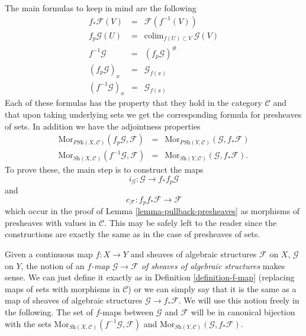 \medskip\noindent
The main formulas to keep in mind are the following
\begin{eqnarray*}
f_*\mathcal{F}(V) & = & \mathcal{F}(f^{-1}(V)) \\
f_p\mathcal{G}(U) & = & \text{colim}_{f(U) \subset V}\ \mathcal{G}(V) \\
f^{-1}\mathcal{G} & = & (f_p\mathcal{G})^\# \\
(f_p\mathcal{G})_x & = & \mathcal{G}_{f(x)} \\
(f^{-1}\mathcal{G})_x & = & \mathcal{G}_{f(x)}
\end{eqnarray*}
Each of these formulas has the property that they hold in the
category $\mathcal{C}$ and that upon taking underlying
sets we get the corresponding formula for presheaves of sets.
In addition we have the adjointness properties
\begin{eqnarray*}
\text{Mor}_{\textit{PSh}(X, \mathcal{C})}(f_p\mathcal{G}, \mathcal{F})
& = &
\text{Mor}_{\textit{PSh}(Y, \mathcal{C})}(\mathcal{G}, f_*\mathcal{F}) \\
\text{Mor}_{\textit{Sh}(X, \mathcal{C})}(f^{-1}\mathcal{G}, \mathcal{F})
& = &
\text{Mor}_{\textit{Sh}(Y, \mathcal{C})}(\mathcal{G}, f_*\mathcal{F}).
\end{eqnarray*}
To prove these, the main step is to construct the maps
$$
i_\mathcal{G} : \mathcal{G} \longrightarrow f_*f_p\mathcal{G}
$$
and
$$
c_{\mathcal{F}} : f_p f_* \mathcal{F} \longrightarrow \mathcal{F}
$$
which occur in the proof of Lemma \ref{lemma-pullback-presheaves} as
morphisms of presheaves with values in $\mathcal{C}$. This may be safely
left to the reader since the constructions are exactly the same
as in the case of presheaves of sets.

\medskip\noindent
Given a continuous map $f : X \to Y$ and sheaves of algebraic
structures $\mathcal{F}$ on $X$, $\mathcal{G}$ on $Y$, the notion
of an {\it $f$-map $\mathcal{G} \to \mathcal{F}$
of sheaves of algebraic structures} makes sense. We can just define
it exactly as in Definition \ref{definition-f-map} (replacing maps
of sets with morphisms in $\mathcal{C}$) or we can
simply say that it is the same as a map of sheaves of algebraic
structures $\mathcal{G} \to f_*\mathcal{F}$. We will use this
notion freely in the following. The set of $f$-maps between
$\mathcal{G}$ and $\mathcal{F}$ will be in canonical bijection
with the sets
$\text{Mor}_{\textit{Sh}(X, \mathcal{C})}(f^{-1}\mathcal{G}, \mathcal{F})$
and
$\text{Mor}_{\textit{Sh}(Y, \mathcal{C})}(\mathcal{G}, f_*\mathcal{F})$.

